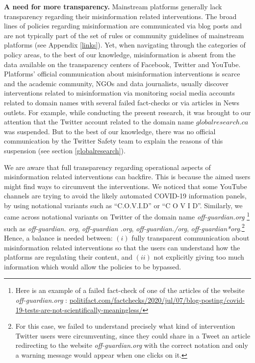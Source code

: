 \documentclass{article}
\begin{document}
\smallskip

{\bf A need for more transparency.} 
Mainstream platforms generally lack transparency regarding their misinformation related interventions.
The broad lines of policies regarding misinformation are communicated via blog posts and are not typically part of the set of rules or community guidelines of mainstream platforms (see Appendix \ref{links}).
Yet, when navigating through the categories of policy areas, to the best of our knowledge, misinformation is absent from the data available on the transparency centers of Facebook, Twitter and YouTube.
Platforms' official communication about misinformation interventions is scarce and the academic community, NGOs and data journalists, usually discover interventions related to misinformation via monitoring social media accounts related to domain names with several failed fact-checks or via articles in News outlets. 
For example, while conducting the present research, it was brought to our attention that the Twitter account related to the domain name $globalresearch.ca$ was suspended. 
But to the best of our knowledge, there was no official communication by the Twitter Safety team to explain the reasons of this suspension (see section \ref{globalresearch}). 

We are aware that full transparency regarding operational aspects of misinformation related interventions can backfire.
This is because the aimed users might find ways to circumvent the interventions. 
We noticed that some YouTube channels are trying to avoid the likely automated COVID-19 information panels, by using notational variants such as ``C.O.V.I.D'' or ``C O V I D''. 
Similarly, we came across notational variants on Twitter of the domain name {\it off-guardian.org}
\footnote{Here is an example of a failed fact-check of one of the articles of the website {\it off-guardian.org} : \href{https://www.politifact.com/factchecks/2020/jul/07/blog-posting/covid-19-tests-are-not-scientifically-meaningless/}{politifact.com/factchecks/2020/jul/07/blog-posting/covid-19-tests-are-not-scientifically-meaningless/}}
such as {\it off-guardian. org}, {\it off-guardian .org}, {\it off-guardian./org}, {\it off-guardian*org}.\footnote{For this case, we failed to understand precisely what kind of intervention Twitter users were circumventing, since they could share in a Tweet an article redirecting to the website {\it off-guardian.org} with the correct notation and only a warning message would appear when one clicks on it.}
Hence, a balance is needed between: $(i)$ fully transparent communication about misinformation related interventions so that the users can understand how the platforms are regulating their content, and $(ii)$ not explicitly giving too much information which would allow the policies to be bypassed.
\end{document}
